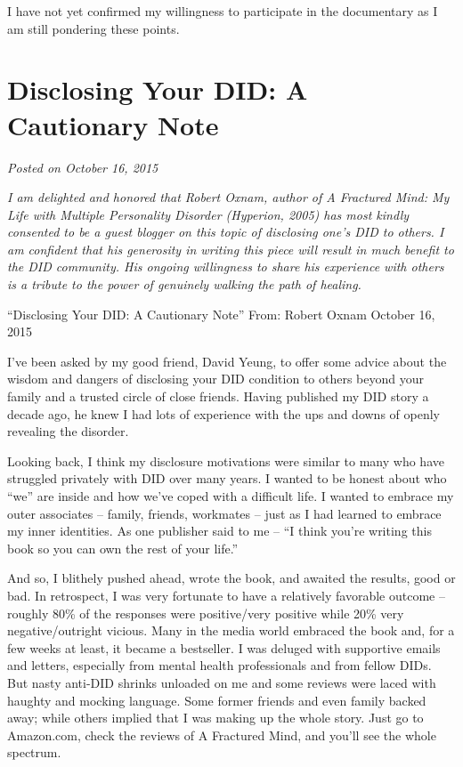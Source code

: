\documentclass[]{book}
\begin{document}
I have not yet confirmed my willingness to participate in the documentary as I am still pondering these points.

\hypertarget{disclosing-your-did-a-cautionary-note}{%
\section{Disclosing Your DID: A Cautionary Note}\label{disclosing-your-did-a-cautionary-note}}

\emph{Posted on October 16, 2015}

\emph{I am delighted and honored that Robert Oxnam, author of A Fractured Mind: My Life with Multiple Personality Disorder (Hyperion, 2005) has most kindly consented to be a guest blogger on this topic of disclosing one's DID to others. I am confident that his generosity in writing this piece will result in much benefit to the DID community. His ongoing willingness to share his experience with others is a tribute to the power of genuinely walking the path of healing.}

``Disclosing Your DID: A Cautionary Note''
From: Robert Oxnam
October 16, 2015

I've been asked by my good friend, David Yeung, to offer some advice about the wisdom and dangers of disclosing your DID condition to others beyond your family and a trusted circle of close friends. Having published my DID story a decade ago, he knew I had lots of experience with the ups and downs of openly revealing the disorder.

Looking back, I think my disclosure motivations were similar to many who have struggled privately with DID over many years. I wanted to be honest about who ``we'' are inside and how we've coped with a difficult life. I wanted to embrace my outer associates -- family, friends, workmates -- just as I had learned to embrace my inner identities. As one publisher said to me -- ``I think you're writing this book so you can own the rest of your life.''

And so, I blithely pushed ahead, wrote the book, and awaited the results, good or bad. In retrospect, I was very fortunate to have a relatively favorable outcome -- roughly 80\% of the responses were positive/very positive while 20\% very negative/outright vicious. Many in the media world embraced the book and, for a few weeks at least, it became a bestseller. I was deluged with supportive emails and letters, especially from mental health professionals and from fellow DIDs. But nasty anti-DID shrinks unloaded on me and some reviews were laced with haughty and mocking language. Some former friends and even family backed away; while others implied that I was making up the whole story. Just go to Amazon.com, check the reviews of A Fractured Mind, and you'll see the whole spectrum.
\end{document}
